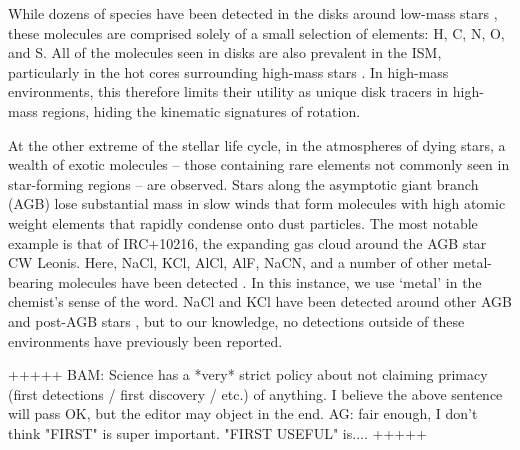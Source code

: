 \documentclass[12pt]{article}
\begin{document}

While dozens of species have been detected in the disks around low-mass stars
\cite{McGuire2018c}, these molecules are comprised solely of a small selection
of elements: H, C, N, O, and S.  All of the molecules seen in disks are also
prevalent in the ISM, particularly in the hot cores surrounding high-mass stars
\cite{some sgr b2 reference}. In high-mass environments, this therefore
limits their utility as unique disk tracers in high-mass regions, hiding
the kinematic signatures of rotation.

At the other extreme of the stellar life cycle, in the atmospheres of dying
stars, a wealth of exotic molecules -- those containing rare elements not
commonly seen in star-forming regions -- are observed.  Stars along the
asymptotic giant branch (AGB) lose substantial mass in slow winds
\cite{Herwig2005a} that form molecules with high atomic weight elements that
rapidly condense onto dust particles.  The most notable example is that of
IRC+10216, the expanding gas cloud around the AGB star CW Leonis.  Here, NaCl,
KCl, AlCl, AlF, NaCN, and a number of other metal-bearing molecules have been
detected \cite{Agundez2012a,Zack2011a}.  In this instance, we use `metal' in
the chemist's sense of the word.  NaCl and KCl have been detected around other
AGB and post-AGB stars
\cite{Milam2007a,Highberger2003a,Sanchez-Contreras2018a}, but to our
knowledge, no detections outside of these environments have previously been
reported.

+++++ BAM: Science has a *very* strict policy about not claiming primacy (first
detections / first discovery / etc.) of anything.  I believe the above sentence
will pass OK, but the editor may object in the end.
AG: fair enough, I don't think "FIRST" is super important.  "FIRST USEFUL"
is....
+++++
\end{document}
